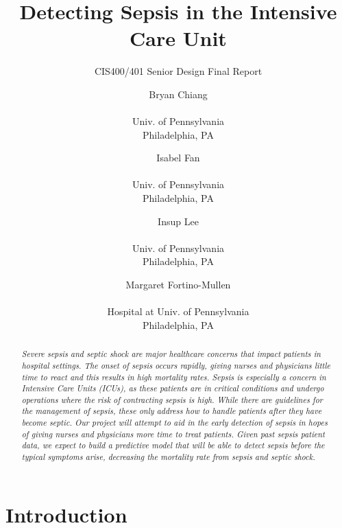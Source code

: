 \documentclass{sig-alternate}
\begin{document}
 

\title{Detecting Sepsis in the Intensive Care Unit}
\subtitle{CIS400/401 Senior Design Final Report}
\author{
Bryan Chiang \\  \\ Univ. of Pennsylvania \\ Philadelphia, PA
\and Isabel Fan \\  \\ Univ. of Pennsylvania \\ Philadelphia, PA   
\and Insup Lee \\  \\ Univ. of Pennsylvania \\ Philadelphia, PA
\and Margaret Fortino-Mullen \\  \\ Hospital at Univ. of Pennsylvania \\ Philadelphia, PA}
\date{}
\maketitle


\begin{abstract}
\vspace{10pt}
\textit{Severe sepsis and septic shock are major healthcare concerns that impact patients in hospital settings. The onset of sepsis occurs rapidly, giving nurses and physicians little time to react and this results in high mortality rates. Sepsis is especially a concern in Intensive Care Units (ICUs), as these patients are in critical conditions and undergo operations where the risk of contracting sepsis is high. While there are guidelines for the management of sepsis, these only address how to handle patients after they have become septic. Our project will attempt to aid in the early detection of sepsis in hopes of giving nurses and physicians more time to treat patients. Given past sepsis patient data, we expect to build a predictive model that will be able to detect sepsis before the typical symptoms arise, decreasing the mortality rate from sepsis and septic shock.} 
\end{abstract}

\vspace{10pt}
\section{Introduction}
\vspace{10pt}
\label{sec:intro}
\end{document}
